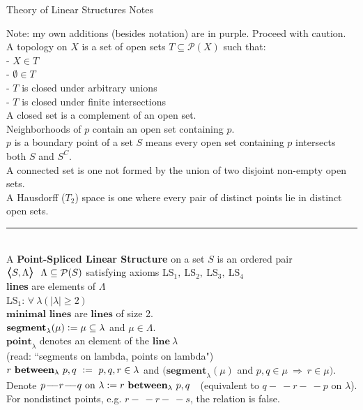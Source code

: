 \documentclass{article}
\newcommand{\hsp}[1][5]{\hspace{0.#1 cm}}
\newcommand{\bra}[1][1.2]{\scalebox{#1}{$\boldsymbol{\langle}$}}
\newcommand{\nl}[1][12]{\\[#1pt]}
\newcommand{\ket}[1][1.2]{\scalebox{#1}{$\boldsymbol{\rangle}$}}
\newcommand{\imp}{\ \Rightarrow\ }
\newcommand{\defeq}{\vcentcolon=}
\newcommand{\ch}[1]{\text{#1}}
\newcommand {\chb}[1]{\textbf{#1}}
\newcommand{\seg}{\!-\!\!\!\!\:-}
\begin{document}
\begin{center}
Theory of Linear Structures Notes
\end{center}
\begin{flushleft}
\hangindent=1.1cm 
Note: my own additions (besides notation) are in {\color{purple} purple}. Proceed with caution.\nl[6]
A topology on $X$ is a set of open sets $T\subseteq \mathcal{P}(X)$ such that:\nl[6]
 - $X \in T$\\
 - $\emptyset \in T$\\
 - $T$ is closed under arbitrary unions\\
 - $T$ is closed under finite intersections\nl[6]
A closed set is a complement of an open set.\\
Neighborhoods of $p$ contain an open set containing $p$.\\
$p$ is a boundary point of a set $S$ means every open set containing $p$ intersects both $S$ and $S^C$.\\
A connected set is one not formed by the union of two disjoint non-empty open sets.\\
A Hausdorff ($T_2$) space is one where every pair of distinct points lie in distinct open sets.\nl[7]

\par\noindent\rule{\textwidth}{0.4pt}\nl[5] %

A \chb{Point-Spliced Linear Structure} on a set $S$ is an ordered pair $\bra S, \Lambda \ket\ \ \Lambda \subseteq \mathcal{P}(S)$ satisfying axioms $\ch{LS}_1,\ \ch{LS}_2,\ \ch{LS}_3,\ \ch{LS}_4$\nl[6]
\hsp[2]\textbf{lines} are elements of $\Lambda$\nl[12]

$\ch{LS}_1$: $\forall\ \lambda\ \big(\ |\lambda|\geq 2\ \big)$\nl[6]\hsp[2]
$\chb{minimal lines}$ are $\chb{lines}$ of size 2.\\\hsp[2]
$\chb{segment}_\lambda(\mu) \defeq \mu \subseteq \lambda$ and $\mu \in \Lambda$.\\\hsp[2]
$\chb{point}_\lambda$ denotes an element of the $\chb{line}\ \lambda $\\\hsp[2]
(read: ``segments on lambda, points on lambda")\nl[6]
\hsp[2] $r\  \chb{between}_\lambda\ p,q \ \defeq \ p,q,r \in \lambda$ and $ \Big( \chb{segment}_\lambda(\mu)$ and $p,q \in \mu \imp r \in \mu \Big)$.\\
\hsp[2] Denote $p \seg r \seg q \ch{ on }\lambda \defeq r\ \chb{between}_\lambda\ p,q\ \ $ (equivalent to $q \seg r \seg p$ on $\lambda$).\\
\hsp[2] For nondistinct points, e.g. $r\seg r\seg s$, the relation is false.\nl[12]


\end{flushleft}
\end{document}
